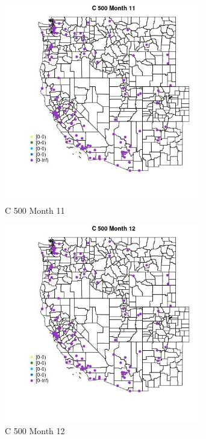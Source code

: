 \begin{figure} 
\centering  
\includegraphics[width=0.77\textwidth]{Code_Outputs/Report_ML_input_PM25_Step4_part_e_de_duplicated_aves_MapObsMo11C_500.jpg} 
\caption{\label{fig:Report_ML_input_PM25_Step4_part_e_de_duplicated_avesMapObsMo11C_500}C 500 Month 11} 
\end{figure} 
 

\begin{figure} 
\centering  
\includegraphics[width=0.77\textwidth]{Code_Outputs/Report_ML_input_PM25_Step4_part_e_de_duplicated_aves_MapObsMo12C_500.jpg} 
\caption{\label{fig:Report_ML_input_PM25_Step4_part_e_de_duplicated_avesMapObsMo12C_500}C 500 Month 12} 
\end{figure} 
 


